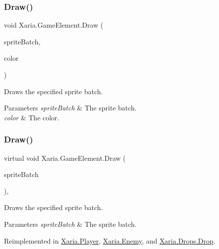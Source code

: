 \subsubsection{\texorpdfstring{Draw()}{Draw()}\hspace{0.1cm}{\footnotesize\ttfamily [1/2]}}
{\footnotesize\ttfamily void Xaria.\+Game\+Element.\+Draw (\begin{DoxyParamCaption}\item[{ref Sprite\+Batch}]{sprite\+Batch,  }\item[{Color}]{color }\end{DoxyParamCaption})\hspace{0.3cm}{\ttfamily [inline]}}



Draws the specified sprite batch. 


\begin{DoxyParams}{Parameters}
{\em sprite\+Batch} & The sprite batch.\\
\hline
{\em color} & The color.\\
\hline
\end{DoxyParams}
\mbox{\label{classXaria_1_1GameElement_a812e0ffbe54519a3fb14a49115bf43d9}} 
\subsubsection{\texorpdfstring{Draw()}{Draw()}\hspace{0.1cm}{\footnotesize\ttfamily [2/2]}}
{\footnotesize\ttfamily virtual void Xaria.\+Game\+Element.\+Draw (\begin{DoxyParamCaption}\item[{ref Sprite\+Batch}]{sprite\+Batch }\end{DoxyParamCaption})\hspace{0.3cm}{\ttfamily [inline]}, {\ttfamily [virtual]}}



Draws the specified sprite batch. 


\begin{DoxyParams}{Parameters}
{\em sprite\+Batch} & The sprite batch.\\
\hline
\end{DoxyParams}


Reimplemented in \hyperlink{classXaria_1_1Player_a25ddea2b9d8679ab6aa649fda6ce1f22}{Xaria.\+Player}, \hyperlink{classXaria_1_1Enemy_a0f857a720f4a5ecc037887c846c55afc}{Xaria.\+Enemy}, and \hyperlink{classXaria_1_1Drops_1_1Drop_a2cd5c3912ae653526a7cc25aefa691b0}{Xaria.\+Drops.\+Drop}.



